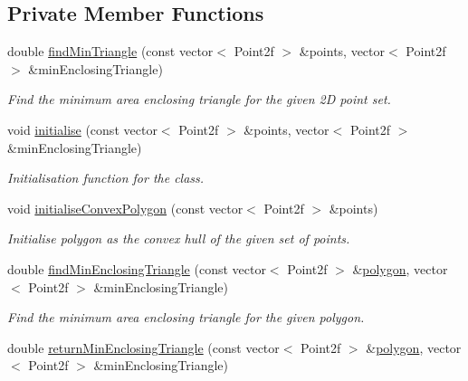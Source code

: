 \subsection*{Private Member Functions}
\begin{DoxyCompactItemize}
\item 
double \hyperlink{classmultiscale_1_1MinEnclosingTriangleFinder_a1540deb145740cb2e73c7c76a9dd244f}{find\-Min\-Triangle} (const vector$<$ Point2f $>$ \&points, vector$<$ Point2f $>$ \&min\-Enclosing\-Triangle)
\begin{DoxyCompactList}\small\item\em Find the minimum area enclosing triangle for the given 2\-D point set. \end{DoxyCompactList}\item 
void \hyperlink{classmultiscale_1_1MinEnclosingTriangleFinder_a6fa2b447626f765d0b9600cabdc810ae}{initialise} (const vector$<$ Point2f $>$ \&points, vector$<$ Point2f $>$ \&min\-Enclosing\-Triangle)
\begin{DoxyCompactList}\small\item\em Initialisation function for the class. \end{DoxyCompactList}\item 
void \hyperlink{classmultiscale_1_1MinEnclosingTriangleFinder_afe8fe342d7ec338ccc0874cce91f2a58}{initialise\-Convex\-Polygon} (const vector$<$ Point2f $>$ \&points)
\begin{DoxyCompactList}\small\item\em Initialise polygon as the convex hull of the given set of points. \end{DoxyCompactList}\item 
double \hyperlink{classmultiscale_1_1MinEnclosingTriangleFinder_a0b55638741cd5ff84d583df33d594a69}{find\-Min\-Enclosing\-Triangle} (const vector$<$ Point2f $>$ \&\hyperlink{classmultiscale_1_1MinEnclosingTriangleFinder_add5aecf2c138345091d55076bdc253a4}{polygon}, vector$<$ Point2f $>$ \&min\-Enclosing\-Triangle)
\begin{DoxyCompactList}\small\item\em Find the minimum area enclosing triangle for the given polygon. \end{DoxyCompactList}\item 
double \hyperlink{classmultiscale_1_1MinEnclosingTriangleFinder_af6e49a1ef5a0d4dbe3e25c2f92d69dc3}{return\-Min\-Enclosing\-Triangle} (const vector$<$ Point2f $>$ \&\hyperlink{classmultiscale_1_1MinEnclosingTriangleFinder_add5aecf2c138345091d55076bdc253a4}{polygon}, vector$<$ Point2f $>$ \&min\-Enclosing\-Triangle)

\end{DoxyCompactItemize}
